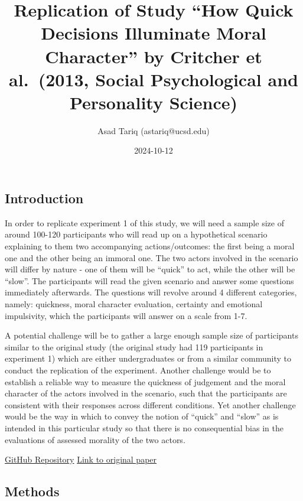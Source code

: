 \documentclass[
  letterpaper,
  DIV=11,
  numbers=noendperiod]{scrartcl}
\title{Replication of Study ``How Quick Decisions Illuminate Moral
Character'' by Critcher et al.~(2013, Social Psychological and
Personality Science)}
\author{Asad Tariq (astariq@ucsd.edu)}
\date{2024-10-12}
\renewcommand*\contentsname{Table of contents}
\newcommand\contentsname{Table of contents}
\begin{document}
\maketitle

\renewcommand*\contentsname{Table of contents}
{
\hypersetup{linkcolor=}
\setcounter{tocdepth}{3}
\tableofcontents
}

\subsection{Introduction}\label{introduction}

In order to replicate experiment 1 of this study, we will need a sample
size of around 100-120 participants who will read up on a hypothetical
scenario explaining to them two accompanying actions/outcomes: the first
being a moral one and the other being an immoral one. The two actors
involved in the scenario will differ by nature - one of them will be
``quick'' to act, while the other will be ``slow''. The participants
will read the given scenario and answer some questions immediately
afterwards. The questions will revolve around 4 different categories,
namely: quickness, moral character evaluation, certainty and emotional
impulsivity, which the participants will answer on a scale from 1-7.

A potential challenge will be to gather a large enough sample size of
participants similar to the original study (the original study had 119
participants in experiment 1) which are either undergraduates or from a
similar community to conduct the replication of the experiment. Another
challenge would be to establish a reliable way to measure the quickness
of judgement and the moral character of the actors involved in the
scenario, such that the participants are consistent with their responses
across different conditions. Yet another challenge would be the way in
which to convey the notion of ``quick'' and ``slow'' as is intended in
this particular study so that there is no consequential bias in the
evaluations of assessed morality of the two actors.

\href{https://github.com/Asad-Tariq/critcher2013}{GitHub Repository}
\href{https://github.com/Asad-Tariq/critcher2013/blob/main/original_paper/Critcher_et_al_2013.pdf}{Link
to original paper}

\subsection{Methods}\label{methods}
\end{document}
